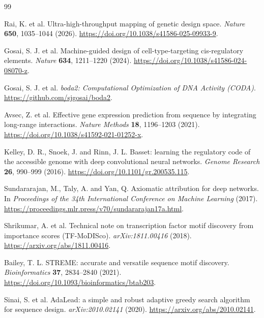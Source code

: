 \documentclass[11pt]{article}
\begin{document}
\begin{thebibliography}{99}

Rai, K. et al.
Ultra-high-throughput mapping of genetic design space.
\textit{Nature} \textbf{650}, 1035--1044 (2026).
\url{https://doi.org/10.1038/s41586-025-09933-9}.

Gosai, S. J. et al.
Machine-guided design of cell-type-targeting cis-regulatory elements.
\textit{Nature} \textbf{634}, 1211--1220 (2024).
\url{https://doi.org/10.1038/s41586-024-08070-z}.

Gosai, S. J. et al.
\textit{boda2: Computational Optimization of DNA Activity (CODA)}.
\url{https://github.com/sjgosai/boda2}.

Avsec, Z. et al.
Effective gene expression prediction from sequence by integrating long-range
interactions.
\textit{Nature Methods} \textbf{18}, 1196--1203 (2021).
\url{https://doi.org/10.1038/s41592-021-01252-x}.

Kelley, D. R., Snoek, J. and Rinn, J. L.
Basset: learning the regulatory code of the accessible genome with deep
convolutional neural networks.
\textit{Genome Research} \textbf{26}, 990--999 (2016).
\url{https://doi.org/10.1101/gr.200535.115}.

Sundararajan, M., Taly, A. and Yan, Q.
Axiomatic attribution for deep networks.
In \textit{Proceedings of the 34th International Conference on Machine
Learning} (2017).
\url{https://proceedings.mlr.press/v70/sundararajan17a.html}.

Shrikumar, A. et al.
Technical note on transcription factor motif discovery from importance scores
(TF-MoDISco).
\textit{arXiv:1811.00416} (2018).
\url{https://arxiv.org/abs/1811.00416}.

Bailey, T. L.
STREME: accurate and versatile sequence motif discovery.
\textit{Bioinformatics} \textbf{37}, 2834--2840 (2021).
\url{https://doi.org/10.1093/bioinformatics/btab203}.

Sinai, S. et al.
AdaLead: a simple and robust adaptive greedy search algorithm for sequence
design.
\textit{arXiv:2010.02141} (2020).
\url{https://arxiv.org/abs/2010.02141}.

\end{thebibliography}
\end{document}
